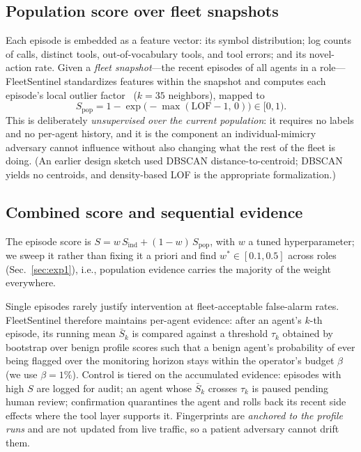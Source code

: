 \documentclass[conference]{IEEEtran}
\newcommand{\sys}{FleetSentinel}
\begin{document}
\subsection{Population score over fleet snapshots}\label{sec:population}
Each episode is embedded as a feature vector: its symbol distribution; log counts of calls, distinct tools, out-of-vocabulary tools, and tool errors; and its novel-action rate. Given a \emph{fleet snapshot}---the recent episodes of all agents in a role---\sys{} standardizes features within the snapshot and computes each episode's local outlier factor~\cite{breunig2000lof} ($k{=}35$ neighbors), mapped to
\begin{equation}
S_{\mathrm{pop}} = 1 - \exp\!\big(-\max(\mathrm{LOF}-1,\,0)\big) \in [0,1).
\label{eq:spop}
\end{equation}
This is deliberately \emph{unsupervised over the current population}: it requires no labels and no per-agent history, and it is the component an individual-mimicry adversary cannot influence without also changing what the rest of the fleet is doing. (An earlier design sketch used DBSCAN distance-to-centroid; DBSCAN yields no centroids, and density-based LOF is the appropriate formalization.)

\subsection{Combined score and sequential evidence}\label{sec:sequential}
The episode score is $S = w\,S_{\mathrm{ind}} + (1-w)\,S_{\mathrm{pop}}$, with $w$ a tuned hyperparameter; we sweep it rather than fixing it a priori and find $w^\ast \in [0.1, 0.5]$ across roles (Sec.~\ref{sec:exp1}), i.e., population evidence carries the majority of the weight everywhere.

Single episodes rarely justify intervention at fleet-acceptable false-alarm rates. \sys{} therefore maintains per-agent evidence: after an agent's $k$-th episode, its running mean $\bar S_k$ is compared against a threshold $\tau_k$ obtained by bootstrap over benign profile scores such that a benign agent's probability of ever being flagged over the monitoring horizon stays within the operator's budget $\beta$ (we use $\beta{=}1\%$). Control is tiered on the accumulated evidence: episodes with high $S$ are logged for audit; an agent whose $\bar S_k$ crosses $\tau_k$ is paused pending human review; confirmation quarantines the agent and rolls back its recent side effects where the tool layer supports it. Fingerprints are \emph{anchored to the profile runs} and are not updated from live traffic, so a patient adversary cannot drift them.
\end{document}
